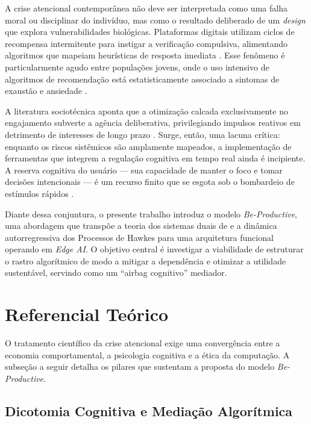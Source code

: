 A crise atencional contemporânea não deve ser interpretada como uma falha moral ou disciplinar do indivíduo, mas como o resultado deliberado de um \textit{design} que explora vulnerabilidades biológicas. Plataformas digitais utilizam ciclos de recompensa intermitente para instigar a verificação compulsiva, alimentando algoritmos que mapeiam heurísticas de resposta imediata \parencite{hari2022}. Esse fenômeno é particularmente agudo entre populações jovens, onde o uso intensivo de algoritmos de recomendação está estatisticamente associado a sintomas de exaustão e ansiedade \parencite{costello2023, hai2021}.

A literatura sociotécnica aponta que a otimização calcada exclusivamente no engajamento subverte a agência deliberativa, privilegiando impulsos reativos em detrimento de interesses de longo prazo \parencite{harris2019}. Surge, então, uma lacuna crítica: enquanto os riscos sistêmicos são amplamente mapeados, a implementação de ferramentas que integrem a regulação cognitiva em tempo real ainda é incipiente. A reserva cognitiva do usuário --- sua capacidade de manter o foco e tomar decisões intencionais --- é um recurso finito que se esgota sob o bombardeio de estímulos rápidos \parencite{paas2023}.

Diante dessa conjuntura, o presente trabalho introduz o modelo \textit{Be-Productive}, uma abordagem que transpõe a teoria dos sistemas duais de \textcite{kahneman2011} e a dinâmica autorregressiva dos Processos de Hawkes \parencite{rizoiu2017} para uma arquitetura funcional operando em \textit{Edge AI}. O objetivo central é investigar a viabilidade de estruturar o rastro algorítmico de modo a mitigar a dependência e otimizar a utilidade sustentável, servindo como um ``airbag cognitivo'' mediador.

\section{Referencial Teórico}

O tratamento científico da crise atencional exige uma convergência entre a economia comportamental, a psicologia cognitiva e a ética da computação. A subseção a seguir detalha os pilares que sustentam a proposta do modelo \textit{Be-Productive}.

\subsection{Dicotomia Cognitiva e Mediação Algorítmica}

